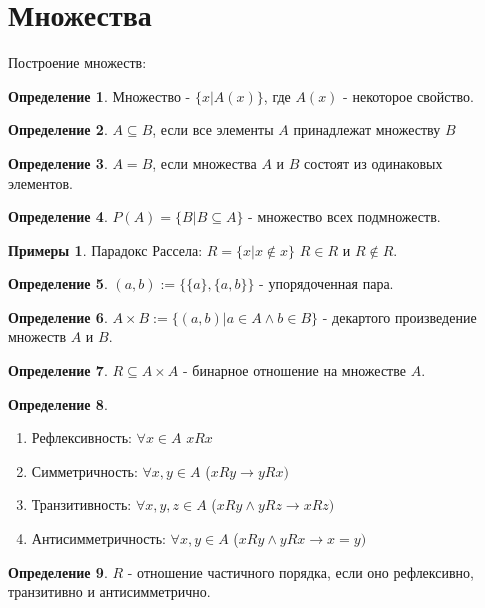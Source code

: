\documentclass[a4paper, 12pt]{article}
\theoremstyle{definition}
\newtheorem*{definition}{Определение}
\newtheorem*{example}{Примеры}
\theoremstyle{plain}
\theoremstyle{remark}
\begin{document}
  \tableofcontents
  \fontsize{14pt}{20pt}\selectfont
  \newpage
  \section {Множества}
  Построение множеств:
  \begin{definition}
    Множество - $\{x|A(x)\}$, где $A(x)$ - некоторое свойство.
  \end{definition}
  \begin{definition}
    $A\subseteq B$, если все элементы $A$ принадлежат множеству $B$
  \end{definition}
  \begin{definition}
    $A=B$, если множества $A$ и $B$ состоят из одинаковых элементов.
  \end{definition}
  \begin{definition}
    $P(A)=\{B|B\subseteq A\}$ - множество всех подмножеств.
  \end{definition}
  \begin{example}
    Парадокс Рассела: $R=\{x|x\notin x\}$ $R\in R$ и  $R\notin R$.
  \end{example}
  \begin{definition}
    $(a,b):=\{\{a\}, \{a, b\}\}$ - упорядоченная пара.
  \end{definition}
  \begin{definition}
    $A\times B:=\{(a, b)|a\in A\wedge b\in B\}$ - декартого произведение множеств $A$ и $B$.
  \end{definition}
  \begin{definition}
    $R\subseteq A\times A$ - бинарное отношение на множестве $A$.
  \end{definition}
  \begin{definition}
    \begin{enumerate}
        \item Рефлексивность: $\forall x\in A$ $xRx$
        \item Симметричность: $\forall x, y\in A$ ($xRy\to yRx)$
        \item Транзитивность: $\forall x, y, z\in A$ ($xRy\wedge yRz\to xRz)$
        \item Антисимметричность: $\forall x, y\in A$ ($xRy\wedge  yRx\to x=y)$ 
    \end{enumerate}
  \end{definition}
  \begin{definition}
    $R$ - отношение частичного порядка, если оно рефлексивно, транзитивно и антисимметрично.
  \end{definition}
\end{document}
